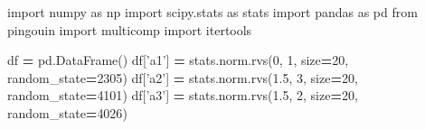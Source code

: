 \documentclass[polish,]{book}
\newenvironment{Shaded}{\begin{snugshade}}{\end{snugshade}}
\newcommand{\DecValTok}[1]{\textcolor[rgb]{0.00,0.00,0.81}{#1}}
\newcommand{\FloatTok}[1]{\textcolor[rgb]{0.00,0.00,0.81}{#1}}
\newcommand{\ImportTok}[1]{#1}
\newcommand{\NormalTok}[1]{#1}
\newcommand{\OperatorTok}[1]{\textcolor[rgb]{0.81,0.36,0.00}{\textbf{#1}}}
\newcommand{\StringTok}[1]{\textcolor[rgb]{0.31,0.60,0.02}{#1}}
\begin{document}
\begin{Shaded}
\begin{Highlighting}[]
\ImportTok{import}\NormalTok{ numpy }\ImportTok{as}\NormalTok{ np}
\ImportTok{import}\NormalTok{ scipy.stats }\ImportTok{as}\NormalTok{ stats}
\ImportTok{import}\NormalTok{ pandas }\ImportTok{as}\NormalTok{ pd}
\ImportTok{from}\NormalTok{ pingouin }\ImportTok{import}\NormalTok{ multicomp}
\ImportTok{import}\NormalTok{ itertools}

\NormalTok{df }\OperatorTok{=}\NormalTok{ pd.DataFrame()}
\NormalTok{df[}\StringTok{'a1'}\NormalTok{] }\OperatorTok{=}\NormalTok{ stats.norm.rvs(}\DecValTok{0}\NormalTok{, }\DecValTok{1}\NormalTok{, size}\OperatorTok{=}\DecValTok{20}\NormalTok{, random_state}\OperatorTok{=}\DecValTok{2305}\NormalTok{)}
\NormalTok{df[}\StringTok{'a2'}\NormalTok{] }\OperatorTok{=}\NormalTok{ stats.norm.rvs(}\FloatTok{1.5}\NormalTok{, }\DecValTok{3}\NormalTok{, size}\OperatorTok{=}\DecValTok{20}\NormalTok{, random_state}\OperatorTok{=}\DecValTok{4101}\NormalTok{)}
\NormalTok{df[}\StringTok{'a3'}\NormalTok{] }\OperatorTok{=}\NormalTok{ stats.norm.rvs(}\FloatTok{1.5}\NormalTok{, }\DecValTok{2}\NormalTok{, size}\OperatorTok{=}\DecValTok{20}\NormalTok{, random_state}\OperatorTok{=}\DecValTok{4026}\NormalTok{)}
  

\end{Highlighting}
\end{Shaded}
\end{document}
